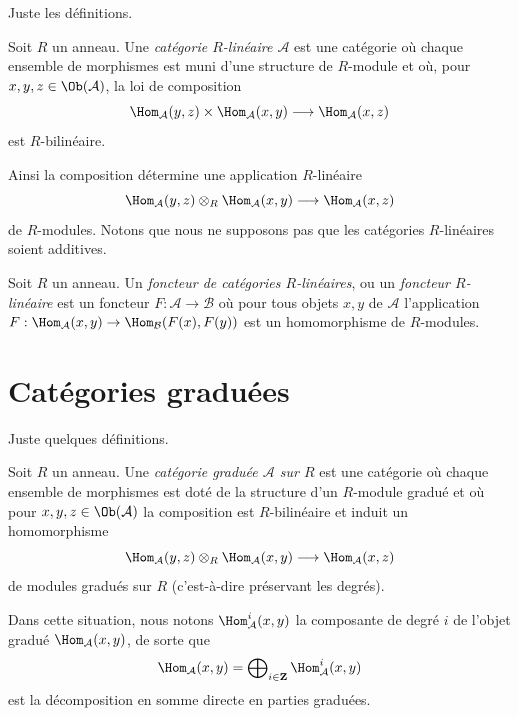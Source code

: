 \noindent
Juste les définitions.

\begin{definition}
\label{definition-linear-category}
Soit $R$ un anneau. Une {\it catégorie $R$-linéaire $\mathcal{A}$} est une
catégorie où chaque ensemble de morphismes est muni d'une structure de $R$-module
et où, pour $x, y, z \in \Ob(\mathcal{A})$, la loi de composition
$$
\Hom_\mathcal{A}(y, z) \times \Hom_\mathcal{A}(x, y)
\longrightarrow
\Hom_\mathcal{A}(x, z)
$$
est $R$-bilinéaire.
\end{definition}

\noindent
Ainsi la composition détermine une application $R$-linéaire
$$
\Hom_\mathcal{A}(y, z) \otimes_R \Hom_\mathcal{A}(x, y)
\longrightarrow
\Hom_\mathcal{A}(x, z)
$$
de $R$-modules. Notons que nous ne supposons pas que les catégories $R$-linéaires
soient additives.

\begin{definition}
\label{definition-functor-linear-categories}
Soit $R$ un anneau. Un {\it foncteur de catégories $R$-linéaires}, ou
un {\it foncteur $R$-linéaire} est un foncteur $F : \mathcal{A} \to
\mathcal{B}$ où pour tous objets $x, y$ de $\mathcal{A}$
l'application $F : \Hom_\mathcal{A}(x, y) \to \Hom_\mathcal{B}(F(x), F(y))$ est
un homomorphisme de $R$-modules.
\end{definition}







\section{Catégories graduées}
\label{section-graded}

\noindent
Juste quelques définitions.

\begin{definition}
\label{definition-graded-category}
Soit $R$ un anneau. Une {\it catégorie graduée $\mathcal{A}$
sur $R$} est une catégorie où chaque ensemble de morphismes est doté de la
structure d'un $R$-module gradué et où pour
$x, y, z \in \Ob(\mathcal{A})$ la composition est $R$-bilinéaire et induit un
homomorphisme
$$
\Hom_\mathcal{A}(y, z) \otimes_R \Hom_\mathcal{A}(x, y)
\longrightarrow
\Hom_\mathcal{A}(x, z)
$$
de modules gradués sur $R$ (c'est-à-dire préservant les degrés).
\end{definition}

\noindent
Dans cette situation, nous notons $\Hom_\mathcal{A}^i(x, y)$ la composante de
degré $i$ de l'objet gradué $\Hom_\mathcal{A}(x, y)$, de sorte que
$$
\Hom_\mathcal{A}(x, y) =
\bigoplus\nolimits_{i \in \mathbf{Z}} \Hom_\mathcal{A}^i(x, y)
$$
est la décomposition en somme directe en parties graduées.

